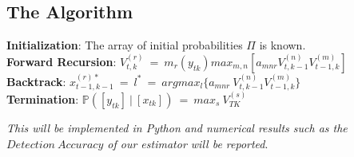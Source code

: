\documentclass[12pt, draftcls, onecolumn]{IEEEtran}
\begin{document}
\subsection{The Algorithm}
\begin{flushleft}
\textbf{Initialization}: The array of initial probabilities $\Pi$ is known.
\\\textbf{Forward Recursion}: $V_{t,k}^{(r)}\ =\ m_r(y_{tk})max_{m,n}[a_{mnr}V_{t,k-1}^{(n)}V_{t-1,k}^{(m)}]$
\\\textbf{Backtrack}: $x_{t-1,k-1}^{(r)*}\ =\ l^*\ =\ argmax_{l}\{a_{mnr}\ V_{t,k-1}^{(n)}V_{t-1,k}^{(m)}\}$
\\\textbf{Termination}: $\mathbb P([y_{tk}]\ |\ [x_{tk}])\ =\ max_s\ V_{TK}^{(s)}$
\end{flushleft}
\textit{This will be implemented in Python and numerical results such as the $Detection\ Accuracy$ of our estimator will be reported}.
\end{document}

